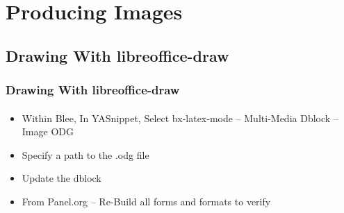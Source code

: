 \section{Producing Images}


\begin{comment}
**  [[elisp:(org-cycle)][| ]] [[elisp:(org-show-subtree)][|=]] [[elisp:(show-children 10)][|V]] [[elisp:(bx:orgm:indirectBufOther)][|>]] [[elisp:(bx:orgm:indirectBufMain)][|I]] [[elisp:(blee:ppmm:org-mode-toggle)][|N]] [[elisp:(org-top-overview)][|O]] [[elisp:(progn (org-shifttab) (org-content))][|C]] [[elisp:(delete-other-windows)][|1]]  /Subsection/   Drawing With libreoffice-draw ::  [[elisp:(org-cycle)][| ]]
\end{comment}

\subsection{Drawing With libreoffice-draw}



\begin{comment}
*****  [[elisp:(org-cycle)][| ]]  [[elisp:(blee:ppmm:org-mode-toggle)][Nat]] [[elisp:(beginning-of-buffer)][Top]] [[elisp:(delete-other-windows)][(1)]] || /Frame/ *Label=DrawingWithlibreoffice-draw*  Drawing With libreoffice-draw ::  [[elisp:(org-cycle)][| ]]
\end{comment}

\begin{frame}[fragile,label=DrawingWithlibreoffice-draw]
    \frametitle{Drawing With libreoffice-draw}
    \framesubtitle{}

    \begin{itemize}
      \item Within Blee, In YASnippet, Select bx-latex-mode -- Multi-Media Dblock -- Image ODG
      \item Specify a path to the .odg file
      \item Update the dblock
      \item From Panel.org -- Re-Build all forms and formats to verify
    \end{itemize}


\end{frame}



